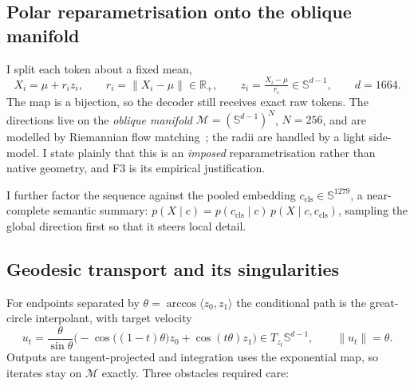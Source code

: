 \documentclass[11pt,a4paper]{article}
\newcommand{\Sph}[1]{\mathbb{S}^{#1}}
\newcommand{\Tang}[1]{T_{#1}}
\newcommand{\R}{\mathbb{R}}
\theoremstyle{plain}
\theoremstyle{remark}
\begin{document}
\subsection{Polar reparametrisation onto the oblique manifold}

I split each token about a fixed mean,
\begin{equation}\label{eq:polar}
X_i = \mu + r_i z_i,\qquad
r_i = \lVert X_i-\mu\rVert \in \R_+,\qquad
z_i = \tfrac{X_i-\mu}{r_i} \in \Sph{d-1},\qquad d=1664 .
\end{equation}
The map is a bijection, so the decoder still receives exact raw tokens. The
directions live on the \emph{oblique manifold} $\mathcal{M}=(\Sph{d-1})^{N}$,
$N=256$, and are modelled by Riemannian flow matching~\cite{chen2024riemannian};
the radii are handled by a light side-model. I state plainly that this is an
\emph{imposed} reparametrisation rather than native geometry, and F3 is its
empirical justification.

I further factor the sequence against the pooled embedding
$c_{\mathrm{cls}}\in\Sph{1279}$, a near-complete semantic summary:
$p(X\mid c) = p(c_{\mathrm{cls}}\mid c)\, p(X\mid c, c_{\mathrm{cls}})$, sampling
the global direction first so that it steers local detail.

\subsection{Geodesic transport and its singularities}

For endpoints separated by $\theta=\arccos\langle z_0,z_1\rangle$ the conditional
path is the great-circle interpolant, with target velocity
\begin{equation}\label{eq:slerpvel}
u_t=\frac{\theta}{\sin\theta}\Big(\!-\cos\big((1-t)\theta\big)z_0+\cos(t\theta)z_1\Big)
\in\Tang{z_t}\Sph{d-1},
\qquad \lVert u_t\rVert=\theta .
\end{equation}
Outputs are tangent-projected and integration uses the exponential map, so
iterates stay on $\mathcal{M}$ exactly. Three obstacles required care:
\end{document}
